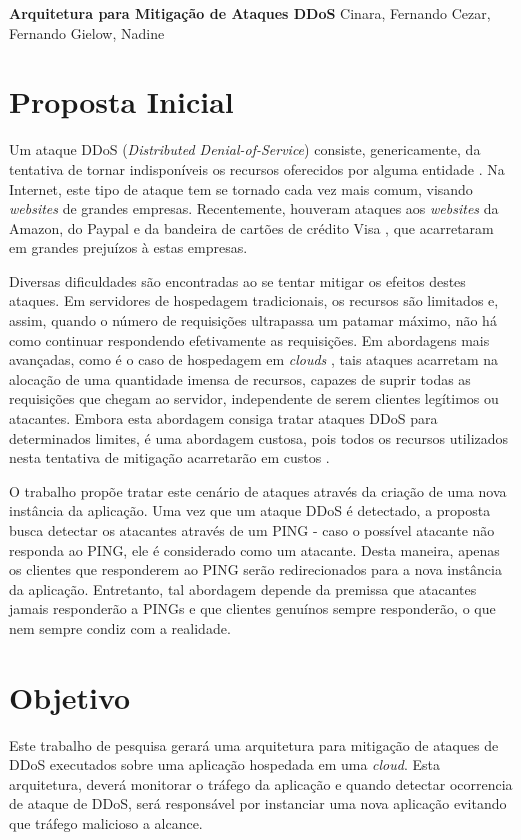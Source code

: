 \documentclass[a4paper, 11pt]{article}
\begin{document}
{
\begin{center}
{\LARGE \textbf{Arquitetura para Mitiga\c{c}\~{a}o de Ataques DDoS}}
\vskip 0.5cm
{\Large Cinara, Fernando Cezar, Fernando Gielow, Nadine}
\end{center}
}

\section{Proposta Inicial}

Um ataque DDoS (\emph{Distributed Denial-of-Service})
 consiste, genericamente, da tentativa de tornar indisponíveis
os recursos oferecidos por alguma entidade \cite{Zhang:11}. Na Internet, este
tipo de ataque tem se tornado cada vez mais comum, visando \emph{websites} de
grandes empresas. Recentemente, houveram ataques aos \emph{websites} da Amazon,
do Paypal e da bandeira de cartões de crédito Visa \cite{Zuckerman:10}, que
acarretaram em grandes prejuízos à estas empresas.

Diversas dificuldades são encontradas ao se tentar mitigar os efeitos destes
ataques. Em servidores de hospedagem tradicionais, os recursos são limitados e,
assim, quando o número de requisições ultrapassa um patamar máximo, não há como
continuar respondendo efetivamente as requisições. Em abordagens mais avançadas,
como é o caso de hospedagem em \emph{clouds} \cite{Zhang:10}, tais ataques
acarretam na alocação de uma quantidade imensa de recursos, capazes de
suprir todas as requisições que chegam ao servidor, independente de serem
clientes legítimos ou atacantes. Embora esta abordagem consiga tratar ataques
DDoS para determinados limites, é uma abordagem custosa, pois todos os recursos
utilizados nesta tentativa de mitigação acarretar\~ao em custos
\cite{Soon:10}.

O trabalho \cite{Bakshi:10} prop\~oe tratar este cen\'ario de ataques através da
criação de uma nova instância da aplicação. Uma vez que um ataque DDoS é
detectado, a proposta busca detectar os atacantes através de um PING -
caso o possível atacante não responda ao PING, ele é considerado como um
atacante. Desta maneira, apenas os clientes que responderem ao PING serão
redirecionados para a nova instância da aplicação. Entretanto, tal abordagem
depende da premissa que atacantes jamais responderão a PINGs e que clientes
genuínos sempre responderão, o que nem sempre condiz com a realidade. 

\section{Objetivo}
Este trabalho de pesquisa gerar\'a uma arquitetura para mitigação de ataques de
DDoS executados sobre uma aplicação hospedada em uma \emph{cloud}. Esta
arquitetura, dever\'a monitorar o tr\'afego da aplica\c{c}\~{a}o e quando
detectar
ocorrencia de ataque de DDoS, ser\'a respons\'avel por instanciar uma nova
aplica\c{c}\~{a}o evitando que tr\'afego malicioso a alcance.
\end{document}
